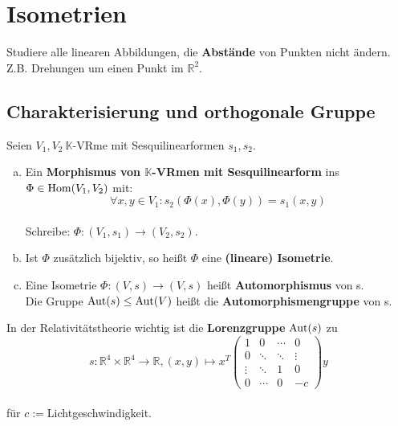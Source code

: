 \documentclass[parskip,a4paper,twoside,DIV15,BCOR12mm]{scrbook}
\begin{document}
\setcounter{chapter}{18}
\chapter{Isometrien}

\begin{task}
Studiere alle linearen Abbildungen, die \textbf{Abstände} von Punkten nicht ändern.
Z.B. Drehungen um einen Punkt im $\mathbb{R}^2$.
\end{task}

\section{Charakterisierung und orthogonale Gruppe}
\begin{definition}
Seien $V_1,V_2\ \mathbb{K}$-VRme mit Sesquilinearformen $s_1,s_2$.
\begin{enumerate}[(a)]
\item Ein \textbf{Morphismus von $\mathbb{K}$-VRmen mit Sesquilinearform} ins
$\Phi\in \operatorname{Hom}(V_1,V_2)$ mit:\\
\[\forall x,y\in V_1:s_2(\Phi(x),\Phi(y))=s_1(x,y)\]\\
Schreibe: $\Phi:(V_1,s_1)\to (V_2,s_2)$.
\item Ist $\Phi$ zusätzlich bijektiv, so heißt $\Phi$ eine \textbf{(lineare) Isometrie}.
\item Eine Isometrie $\Phi:(V,s)\to (V,s)$ heißt \textbf{Automorphismus} von s.\\
Die Gruppe $\operatorname{Aut}(s)\le\operatorname{Aut}(V)$ heißt die \textbf{Automorphismengruppe} von s.
\end{enumerate}
\end{definition}

\begin{example}
In der Relativitätstheorie wichtig ist die \textbf{Lorenzgruppe} $\operatorname{Aut}(s)$ zu\\
\[s:\mathbb{R}^4 \times \mathbb{R}^4 \to\mathbb{R}, (x,y)\mapsto x^T
\begin{pmatrix}
1&0&\cdots&0\\
0&\ddots&\ddots&\vdots\\
\vdots&\ddots&1&0\\
0&\cdots&0&-c
\end{pmatrix}
y\]\\ 
für $c:=$Lichtgeschwindigkeit.
\end{example}
\end{document}
